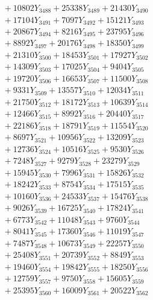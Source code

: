 \documentclass[a4paper,10pt]{article}
\begin{document}
{\begin{align}
&\;  + 10802 Y_{3488} + 25338 Y_{3489} + 21430 Y_{3490} \\[0.3ex]
&\;  + 17104 Y_{3491} + 7097 Y_{3492} + 15121 Y_{3493} \\[0.3ex]
&\;  + 20867 Y_{3494} + 8216 Y_{3495} + 23795 Y_{3496} \\[0.3ex]
&\;  + 8892 Y_{3497} + 20176 Y_{3498} + 18350 Y_{3499} \\[0.3ex]
&\;  + 21310 Y_{3500} + 18453 Y_{3501} + 17927 Y_{3502} \\[0.3ex]
&\;  + 14309 Y_{3503} + 17025 Y_{3504} + 9404 Y_{3505} \\[0.3ex]
&\;  + 19720 Y_{3506} + 16653 Y_{3507} + 11500 Y_{3508} \\[0.5ex]\allowbreak
&\;  + 9331 Y_{3509} + 13557 Y_{3510} + 12034 Y_{3511} \\[0.3ex]
&\;  + 21750 Y_{3512} + 18172 Y_{3513} + 10639 Y_{3514} \\[0.3ex]
&\;  + 12466 Y_{3515} + 8992 Y_{3516} + 20440 Y_{3517} \\[0.3ex]
&\;  + 22186 Y_{3518} + 18791 Y_{3519} + 11554 Y_{3520} \\[0.3ex]
&\;  + 8697 Y_{3521} + 10956 Y_{3522} + 13209 Y_{3523} \\[0.3ex]
&\;  + 12736 Y_{3524} + 10516 Y_{3525} + 9530 Y_{3526} \\[0.3ex]
&\;  + 7248 Y_{3527} + 9279 Y_{3528} + 23279 Y_{3529} \\[0.3ex]
&\;  + 15945 Y_{3530} + 7996 Y_{3531} + 15826 Y_{3532} \\[0.3ex]
&\;  + 18242 Y_{3533} + 8754 Y_{3534} + 17515 Y_{3535} \\[0.3ex]
&\;  + 10160 Y_{3536} + 24533 Y_{3537} + 15476 Y_{3538} \\[0.5ex]\allowbreak
&\;  + 9026 Y_{3539} + 16725 Y_{3540} + 17824 Y_{3541} \\[0.3ex]
&\;  + 6773 Y_{3542} + 11048 Y_{3543} + 9760 Y_{3544} \\[0.3ex]
&\;  + 8041 Y_{3545} + 17360 Y_{3546} + 11019 Y_{3547} \\[0.3ex]
&\;  + 7487 Y_{3548} + 10673 Y_{3549} + 22257 Y_{3550} \\[0.3ex]
&\;  + 25408 Y_{3551} + 20739 Y_{3552} + 8849 Y_{3553} \\[0.3ex]
&\;  + 19460 Y_{3554} + 19842 Y_{3555} + 18250 Y_{3556} \\[0.3ex]
&\;  + 12759 Y_{3557} + 9750 Y_{3558} + 15605 Y_{3559} \\[0.3ex]
&\;  + 25395 Y_{3560} + 16009 Y_{3561} + 20522 Y_{3562} \\[0.3ex]

\end{align}}
\end{document}
